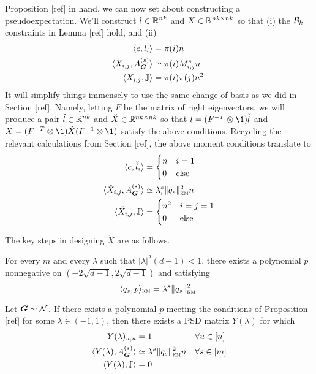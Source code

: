 Proposition [ref] in hand, we can now set about constructing a pseudoexpectation. We'll construct $l\in \mathbb{R}^{nk}$ and $X \in \mathbb{R}^{nk\times nk}$ so that (i) the $\mathcal{B}_k$ constraints in Lemma [ref] hold, and (ii)
\begin{align*}
    \langle e, l_i \rangle &= \pi(i)n \\
    \langle X_{i,j}, A^{(s)}_{\boldsymbol{G}} \rangle &\simeq \pi(i)M_{i,j}^s n \\
    \langle X_{i,j}, \mathbb{J} \rangle &= \pi(i)\pi(j)n^2. 
\end{align*}
It will simplify things immensely to use the same change of basis as we did in Section [ref]. Namely, letting $F$ be the matrix of right eigenvectors, we will produce a pair $\check l \in \mathbb{R}^{nk}$ and $\check X \in \mathbb{R}^{nk\times nk}$ so that $l = (F^{-T} \otimes \1) \check l$ and $X = (F^{-T}\otimes \1) \check X (F^{-1} \otimes \1)$ satisfy the above conditions. Recycling the relevant calculations from Section [ref], the above moment conditions translate to
\begin{align*}
    \langle e, \check l_i \rangle &= \begin{cases} n & i = 1 \\ 0 & \text{else} \end{cases} \\
    \langle \check X_{i,j}, A^{(s)}_{\boldsymbol{G}} \rangle &\simeq \lambda_i^s \|q_s\|^2_{\textsc{km}} n \\
    \langle \check X_{i,j}, \mathbb{J} \rangle &= \begin{cases} n^2 & i=j = 1 \\ 
    0 & \text{else} \end{cases}
\end{align*}

The key steps in designing $\check X$ are as follows.
%
\begin{proposition}
    For every $m$ and every $\lambda$ such that $|\lambda|^2(d-1) < 1$, there exists a polynomial $p$ nonnegative on $(-2\sqrt{d-1},2\sqrt{d-1})$ and satisfying
    $$
        \langle q_s,p \rangle_{\textsc{km}} = \lambda^s\|q_s\|^2_{\textsc{km}}.
    $$
\end{proposition}
\begin{proposition}
    Let $\boldsymbol{G} \sim \mathcal{N}$. If there exists a polynomial $p$ meeting the conditions of Proposition [ref] for some $\lambda \in (-1,1)$, then there exists a PSD matrix $Y(\lambda)$ for which
    \begin{align*}
        Y(\lambda)_{u,u} &= 1 & & \forall u\in[n] \\
         \langle Y(\lambda), A^{(s)}_{\boldsymbol{G}} \rangle &\simeq \lambda^s \|q_s\|^2_{\textsc{km}}n & & \forall s \in[m] \\
         \langle Y(\lambda),\mathbb{J} \rangle &= 0
    \end{align*}
\end{proposition}

